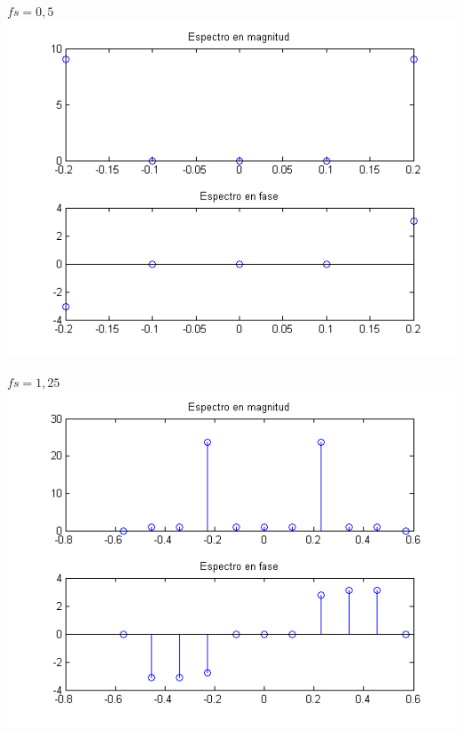 \documentclass[a4paper,12pt]{article}
\begin{document}
\begin{enumerate}
\begin{center}
$fs = 0,5$
\includegraphics[width=.9 \textwidth]{../ejercicio-5-a.png}
\end{center}

\begin{center}
$fs = 1,25$
\includegraphics[width=.9 \textwidth]{../ejercicio-5-b.png}
\end{center}



\end{enumerate}
\end{document}

